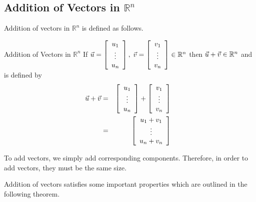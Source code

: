\subsection{Addition of Vectors in \texorpdfstring{$\mathbb{R}^n$}{Rn}}

Addition of vectors in $\mathbb{R}^n$ is defined as follows.  

\begin{definition}{Addition of Vectors in $\mathbb{R}^n$}\label{def:vectoraddition}
If $\vec{u}=\left[ \begin{array}{c}
u_{1} \\
\vdots \\
u_{n}
\end{array}
\right],\; \vec{v}= \left[ \begin{array}{c}
v_{1} \\
\vdots \\
v_{n}
\end{array}
\right] \in \mathbb{R}^{n}$
then $\vec{u}+\vec{v}\in \mathbb{R}^{n}$ and is defined by
\begin{eqnarray*}
\vec{u}+\vec{v} &=& \left[ \begin{array}{c}
u_{1} \\
\vdots \\
u_{n}
\end{array}
\right] +  \left[ \begin{array}{c}
v_{1} \\
\vdots \\
v_{n}
\end{array} \right]\\
& =& \left[ \begin{array}{c}
u_{1}+v_{1} \\
\vdots \\
u_{n}+v_{n}
\end{array}
\right]
\end{eqnarray*}
\end{definition}

To add vectors, we simply add corresponding components. Therefore, in order to add vectors, they must
be the same size.

Addition of vectors satisfies some important properties which are outlined in the following theorem.  

